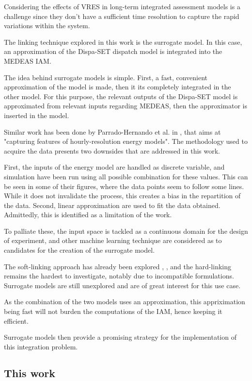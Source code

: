 Considering the effects of VRES in long-term integrated assessment models is a challenge since they don't have a sufficient time resolution to capture the rapid variations within the system.

The linking technique explored in this work is the surrogate model. In this case, an approximation of the Dispa-SET dispatch model is integrated into the MEDEAS IAM. 

The idea behind surrogate models is simple. First, a fast, convenient approximation of the model is made, then it its completely integrated in the other model. For this purpose, the relevant outputs of the Dispa-SET model is approximated from relevant inputs regarding MEDEAS, then the approximator is inserted in the model.

Similar work has been done by Parrado-Hernando et al. in \cite{Hernando2022}, that aims at "capturing features of hourly-resolution energy models". The methodology used to acquire the data presents two downsides that are addressed in this work.

First, the inputs of the energy model are handled as discrete variable, and simulation have been run using all possible combination for these values. This can be seen in some of their figures, where the data points seem to follow some lines. While it does not invalidate the process, this creates a bias in the repartition of the data. Second, linear approximation are used to fit the data obtained. Admittedly, this is identified as a limitation of the work.

To palliate these, the input space is tackled as a continuous domain for the design of experiment, and other machine learning technique are considered as to candidates for the creation of the surrogate model.

The soft-linking approach has already been explored \cite{Brinkerink2022-softlink}, \cite{DEane2012-softlink}, and the hard-linking remains the hardest to investigate, notably due to incompatible formulations. Surrogate models are still unexplored and are of great interest for this use case.

As the combination of the two models uses an approximation, this appriximation being fast will not burden the computations of the IAM, hence keeping it efficient.

Surrogate models then provide a promising strategy for the implementation of this integration problem.

\subsection{This work}

